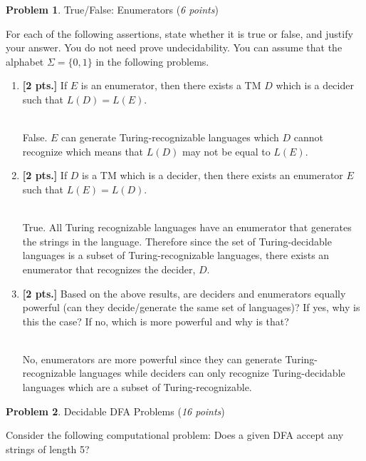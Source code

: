 \documentclass[11pt]{article}
\theoremstyle{definition}
\theoremstyle{theorem}
\newtheorem{prob}{Problem}
\newcommand{\solution}{\medskip\noindent{\color{blue}\textbf{Solution:}}}
\begin{document}
\newpage

\begin{prob} True/False: Enumerators (\emph{6 points})\end{prob}


For each of the following assertions, state whether it is true or false, and justify your answer. You do not need prove undecidability. You can assume that the alphabet $\Sigma = \{0, 1\}$ in the following problems.

\begin{enumerate}[label=(\alph*)]

\item \textbf{[2 pts.]} If $E$ is an enumerator, then there exists a TM $D$ which is a decider such that $L(D) = L(E)$.  

\solution \\
False. $E$ can generate Turing-recognizable languages which $D$ cannot recognize which means that $L(D)$ may not be equal to $L(E)$.


\item \textbf{[2 pts.]} If $D$ is a TM which is a decider, then there exists an enumerator $E$ such that $L(E) = L(D)$.


\solution \\
True. All Turing recognizable languages have an enumerator that generates the strings in the language. Therefore since the set of Turing-decidable languages is a subset of Turing-recognizable languages, there exists an enumerator that recognizes the decider, $D$. 




\item \textbf{[2 pts.]} Based on the above results, are deciders and enumerators equally powerful (can they decide/generate the same set of languages)? If yes, why is this the case? If no, which is more powerful and why is that?

\solution \\
No, enumerators are more powerful since they can generate Turing-recognizable languages while deciders can only recognize Turing-decidable languages which are a subset of Turing-recognizable.


\end{enumerate}


\newpage

\begin{prob} Decidable DFA Problems (\emph{16 points})\end{prob}

Consider the following computational problem: Does a given DFA accept any strings of length 5?
\end{document}
